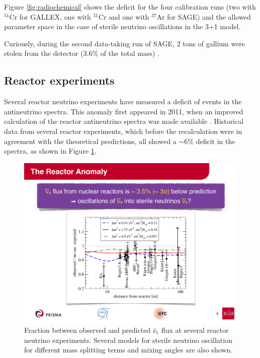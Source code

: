 Figure \ref{fig:radiochemical} shows the deficit for the four calibration runs (two with $^{51}$Cr for GALLEX, one with $^{51}$Cr and one with $^{37}$Ar for SAGE) and the allowed parameter space in the case of sterile neutrino oscillations in the 3+1 model.

Curiously, during the second data-taking run of SAGE, 2 tons of gallium were stolen from the detector (3.6\% of the total mass) \cite{Abdurashitov:1999zd}.
    
\subsection{Reactor experiments} 
Several reactor neutrino experiments have measured a deficit of events in the antineutrino spectra. This anomaly first appeared in 2011, when an improved calculation of the reactor antineutrino spectra was made available \cite{Mueller:2011nm}. Historical data from several reactor experiments, which before the recalculation were in agreement with the theoretical predictions, all showed a $\sim6\%$ deficit in the spectra, as shown in Figure \ref{fig:reactor}. 
    
    \begin{figure}[htbp]
      \centering
      \includegraphics[width=0.75\linewidth]{figures/reactor.pdf}
      \caption{Fraction between observed and predicted $\bar{\nu}_{e}$ flux at several reactor neutrino experiments. Several models for sterile neutrino oscillation for different mass splitting terms and mixing angles are also shown.}
    \label{fig:reactor}
    \end{figure}
    
